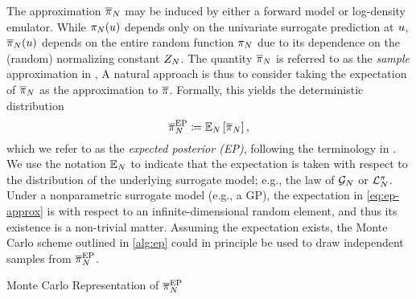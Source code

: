 \documentclass[12pt]{article}
\begin{document}
The approximation $\llikEmRdm[\Ndesign]{\postDensNorm}$ may be induced by either a 
forward model or log-density emulator. While $\llikEmRdmDens[\Ndesign](\Par)$ depends 
only on the univariate surrogate prediction at $\Par$, $\llikEmRdm[\Ndesign]{\postDensNorm}(\Par)$
depends on the entire random function $\llikEmRdmDens[\Ndesign]$ due to its dependence on 
the (random) normalizing constant $\llikEmRdm[\Ndesign]{\normCst}$. The quantity
$\llikEmRdm[\Ndesign]{\postDensNorm}$ is referred to as the \textit{sample} approximation in
\citet{StuartTeck1, StuartTeck2,random_fwd_models,TeckHyperpar},
A natural approach is thus to consider taking the expectation of $\llikEmRdm[\Ndesign]{\postDensNorm}$
as the approximation to $\postDensNorm$. Formally, this yields the deterministic distribution
\begin{equation}
\llikEmSampDensNorm \Def \E_{\Ndesign}\left[ \llikEmRdm[\Ndesign]{\postDensNorm} \right], \label{eq:ep-approx}
\end{equation}
which we refer to as the \textit{expected posterior (EP)}, following the terminology in \citet{BurknerSurrogate}.
We use the notation $\E_{\Ndesign}$ to indicate that the expectation is taken with respect to the 
distribution of the underlying surrogate model; e.g., the law of $\fwdEm[\Ndesign]$ or $\lpostEm[\Ndesign]$.
Under a nonparametric surrogate model (e.g., a GP), the expectation in \cref{eq:ep-approx} is with 
respect to an infinite-dimensional random element, and thus its existence is a non-trivial matter.
Assuming the expectation exists, the Monte Carlo scheme outlined in \cref{alg:ep} could in principle 
be used to draw independent samples from $\llikEmSampDensNorm$. 

\begin{algorithm}
    \caption{Monte Carlo Representation of $\llikEmSampDensNorm$}
    \label{alg:ep}
    \begin{algorithmic}[1] %
        		\State $\llikEmRdm[\Ndesign]{\postDensNorm}^{(\sampleIndex)} \sim \law(\llikEmRdm[\Ndesign]{\postDensNorm})$ 
		\State $\Par^{(\sampleIndex)} \sim \llikEmRdm[\Ndesign]{\postDensNorm}^{(\sampleIndex)}}$ \Comment{Sample a parameter}
	\EndFor
	\State \Return $(\Par^{(1)}, \dots, \Par^{(\NSample)})$
	\EndFunction
    \end{algorithmic}
\end{algorithm}
\end{document}
